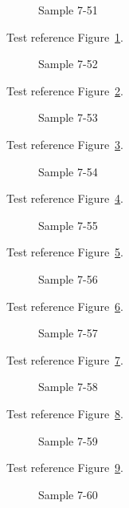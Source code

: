 \begin{figure}[tbhp]
\caption{Sample 7-51}
\label{fig:sample-7-51}
\end{figure}

Test reference Figure~\ref{fig:sample-7-51}.

\begin{figure}[tbhp]
\caption{Sample 7-52}
\label{fig:sample-7-52}
\end{figure}

Test reference Figure~\ref{fig:sample-7-52}.

\begin{figure}[tbhp]
\caption{Sample 7-53}
\label{fig:sample-7-53}
\end{figure}

Test reference Figure~\ref{fig:sample-7-53}.

\begin{figure}[tbhp]
\caption{Sample 7-54}
\label{fig:sample-7-54}
\end{figure}

Test reference Figure~\ref{fig:sample-7-54}.

\begin{figure}[tbhp]
\caption{Sample 7-55}
\label{fig:sample-7-55}
\end{figure}

Test reference Figure~\ref{fig:sample-7-55}.

\begin{figure}[tbhp]
\caption{Sample 7-56}
\label{fig:sample-7-56}
\end{figure}

Test reference Figure~\ref{fig:sample-7-56}.

\begin{figure}[tbhp]
\caption{Sample 7-57}
\label{fig:sample-7-57}
\end{figure}

Test reference Figure~\ref{fig:sample-7-57}.

\begin{figure}[tbhp]
\caption{Sample 7-58}
\label{fig:sample-7-58}
\end{figure}

Test reference Figure~\ref{fig:sample-7-58}.

\begin{figure}[tbhp]
\caption{Sample 7-59}
\label{fig:sample-7-59}
\end{figure}

Test reference Figure~\ref{fig:sample-7-59}.

\begin{figure}[tbhp]
\caption{Sample 7-60}
\label{fig:sample-7-60}
\end{figure}

